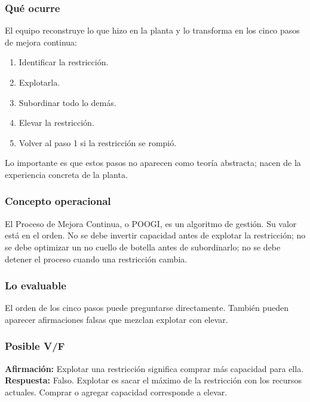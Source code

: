 \documentclass[
  11pt,
]{article}
\providecommand{\tightlist}{%
  \setlength{\itemsep}{0pt}\setlength{\parskip}{0pt}}
\begin{document}
\hypertarget{quuxe9-ocurre-9}{%
\subsubsection{Qué ocurre}\label{quuxe9-ocurre-9}}

El equipo reconstruye lo que hizo en la planta y lo transforma en los
cinco pasos de mejora continua:

\begin{enumerate}
\def\labelenumi{\arabic{enumi}.}
\tightlist
\item
  Identificar la restricción.
\item
  Explotarla.
\item
  Subordinar todo lo demás.
\item
  Elevar la restricción.
\item
  Volver al paso 1 si la restricción se rompió.
\end{enumerate}

Lo importante es que estos pasos no aparecen como teoría abstracta;
nacen de la experiencia concreta de la planta.

\hypertarget{concepto-operacional-9}{%
\subsubsection{Concepto operacional}\label{concepto-operacional-9}}

El Proceso de Mejora Continua, o POOGI, es un algoritmo de gestión. Su
valor está en el orden. No se debe invertir capacidad antes de explotar
la restricción; no se debe optimizar un no cuello de botella antes de
subordinarlo; no se debe detener el proceso cuando una restricción
cambia.

\hypertarget{lo-evaluable-9}{%
\subsubsection{Lo evaluable}\label{lo-evaluable-9}}

El orden de los cinco pasos puede preguntarse directamente. También
pueden aparecer afirmaciones falsas que mezclan explotar con elevar.

\hypertarget{posible-vf-9}{%
\subsubsection{Posible V/F}\label{posible-vf-9}}

\textbf{Afirmación:} Explotar una restricción significa comprar más
capacidad para ella.\\
\textbf{Respuesta:} Falso. Explotar es sacar el máximo de la restricción
con los recursos actuales. Comprar o agregar capacidad corresponde a
elevar.
\end{document}
